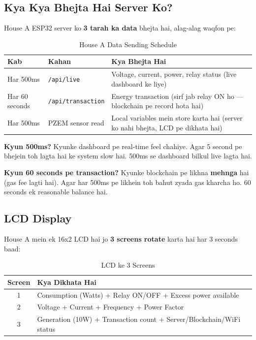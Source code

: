 \subsection{Kya Kya Bhejta Hai Server Ko?}

House A ESP32 server ko \textbf{3 tarah ka data} bhejta hai, alag-alag waqfon pe:

\begin{table}[H]
\centering
\begin{tabularx}{\textwidth}{l l X}
\toprule
\textbf{Kab} & \textbf{Kahan} & \textbf{Kya Bhejta Hai} \\
\midrule
Har 500ms & \texttt{/api/live} & Voltage, current, power, relay status (live dashboard ke liye) \\
Har 60 seconds & \texttt{/api/transaction} & Energy transaction (sirf jab relay ON ho --- blockchain pe record hota hai) \\
Har 500ms & PZEM sensor read & Local variables mein store karta hai (server ko nahi bhejta, LCD pe dikhata hai) \\
\bottomrule
\end{tabularx}
\caption{House A Data Sending Schedule}
\end{table}

\textbf{Kyun 500ms?} Kyunke dashboard pe real-time feel chahiye. Agar 5 second pe bhejein toh lagta hai ke system slow hai. 500ms se dashboard bilkul live lagta hai.

\textbf{Kyun 60 seconds pe transaction?} Kyunke blockchain pe likhna \textbf{mehnga} hai (gas fee lagti hai). Agar har 500ms pe likhein toh bahut zyada gas kharcha ho. 60 seconds ek reasonable balance hai.

\subsection{LCD Display}

House A mein ek 16x2 LCD hai jo \textbf{3 screens rotate} karta hai har 3 seconds baad:

\begin{table}[H]
\centering
\begin{tabularx}{\textwidth}{c X}
\toprule
\textbf{Screen} & \textbf{Kya Dikhata Hai} \\
\midrule
1 & Consumption (Watts) + Relay ON/OFF + Excess power available \\
2 & Voltage + Current + Frequency + Power Factor \\
3 & Generation (10W) + Transaction count + Server/Blockchain/WiFi status \\
\bottomrule
\end{tabularx}
\caption{LCD ke 3 Screens}
\end{table}

